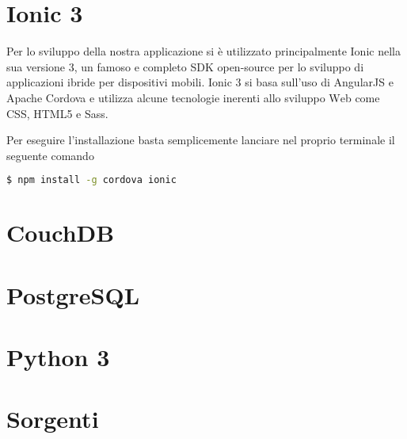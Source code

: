 \documentclass[a4paper,titlepage]{book}
\begin{document}
\section{Ionic 3}
Per lo sviluppo della nostra applicazione si \`{e} utilizzato principalmente Ionic nella sua versione 3, un famoso e completo {\foreignlanguage{english} SDK open-source} per lo sviluppo di applicazioni ibride per dispositivi mobili. 
Ionic 3 si basa sull'uso di AngularJS e Apache Cordova e utilizza alcune tecnologie inerenti allo sviluppo {\foreignlanguage{english} Web} come CSS, HTML5 e Sass.

Per eseguire l'installazione basta semplicemente lanciare nel proprio terminale il seguente comando
\begin{lstlisting}[language=bash]
  $ npm install -g cordova ionic
\end{lstlisting}


\section{CouchDB}


\section{PostgreSQL}


\section{Python 3}


\section{Sorgenti}
\end{document}
